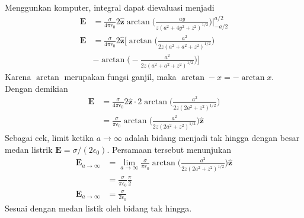 \documentclass[../../../main.tex]{subfiles}
\begin{document}
Menggunkan komputer, integral dapat dievaluasi menjadi
\begin{align*}
    \mathbf{E}&=\frac{\sigma}{4\pi\epsilon_0} 2\boldsymbol{\hat{z}}\arctan\biggl(\frac{ay}{z(a^2+4y^2+z^2)^{1/2}}\biggr)\Bigg|_{-a/2}^{a/2}\\
    \mathbf{E}&=\frac{\sigma}{4\pi\epsilon_0} 2\boldsymbol{\hat{z}}\Bigg[ \arctan\biggl(\frac{a^2}{2z(a^2+a^2+z^2)^{1/2}}\biggr)\\& -\arctan\biggl(-\frac{a^2}{2z(a^2+a^2+z^2)^{1/2}}\biggr)\Bigg]
\end{align*}
Karena $\arctan $ merupakan fungsi ganjil, maka $\arctan -x=-\arctan x$. Dengan demikian
\begin{align*}
    \mathbf{E}&=\frac{\sigma}{4\pi\epsilon_0} 2\boldsymbol{\hat{z}}\cdot2\arctan\biggl(\frac{a^2}{2z(2a^2+z^2)^{1/2}}\biggr)\\
    &=\frac{\sigma}{\pi\epsilon_0} \arctan\biggl(\frac{a^2}{2z(2a^2+z^2)^{1/2}}\biggr) \boldsymbol{\hat{z}}
\end{align*}
Sebagai cek, limit ketika $a\rightarrow\infty$ adalah bidang menjadi tak hingga dengan besar medan listrik $\mathbf{E}=\sigma/(2\epsilon_0)$. Persamaan tersebut menunjukan
\begin{align*}
    \mathbf{E}_{a\rightarrow\infty}&=\lim_{a\rightarrow\infty}\frac{\sigma}{\pi\epsilon_0} \arctan\biggl(\frac{a^2}{2z(2a^2+z^2)^{1/2}}\biggr) \boldsymbol{\hat{z}}\\
    &=\frac{\sigma}{\pi\epsilon_0} \frac{\pi}{2}\\
    \mathbf{E}_{a\rightarrow\infty}&=\frac{\sigma}{2\epsilon_0} 
\end{align*}
Sesuai dengan medan listik oleh bidang tak hingga.
\end{document}
